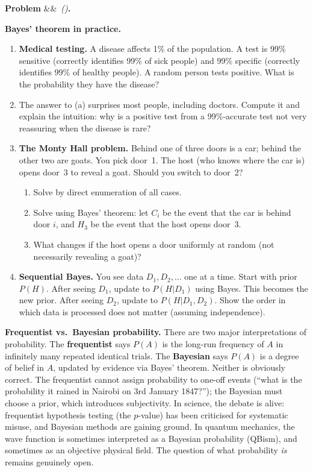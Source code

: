 \documentclass[12pt, a4paper]{article}
\newcounter{problem}
\newenvironment{problem}[1][]{%
  \refstepcounter{problem}%
  \par\vspace{6pt}%
  \noindent\textbf{\color{MidBlue}Problem \theproblem}%
  \ifx&#1&\else\ \textit{(#1)}\fi\textbf{.}\enskip
}{\par\vspace{4pt}}
\begin{document}
\begin{problem}
\label{prob:bayes_apps}
\textbf{Bayes' theorem in practice.}
\begin{enumerate}[label=(\alph*),topsep=2pt]
  \item \textbf{Medical testing.} A disease affects 1\% of the population. A test is 99\% sensitive (correctly identifies 99\% of sick people) and 99\% specific (correctly identifies 99\% of healthy people). A random person tests positive. What is the probability they have the disease?
  \item The answer to (a) surprises most people, including doctors. Compute it and explain the intuition: why is a positive test from a 99\%-accurate test not very reassuring when the disease is rare?
  \item \textbf{The Monty Hall problem.} Behind one of three doors is a car; behind the other two are goats. You pick door~1. The host (who knows where the car is) opens door~3 to reveal a goat. Should you switch to door~2?
  \begin{enumerate}[label=(\roman*),noitemsep]
    \item Solve by direct enumeration of all cases.
    \item Solve using Bayes' theorem: let $C_i$ be the event that the car is behind door $i$, and $H_3$ be the event that the host opens door~3.
    \item What changes if the host opens a door uniformly at random (not necessarily revealing a goat)?
  \end{enumerate}
  \item \textbf{Sequential Bayes.} You see data $D_1,D_2,\ldots$ one at a time. Start with prior $P(H)$. After seeing $D_1$, update to $P(H|D_1)$ using Bayes. This becomes the new prior. After seeing $D_2$, update to $P(H|D_1,D_2)$. Show the order in which data is processed does not matter (assuming independence).
\end{enumerate}
\end{problem}

\begin{thought}
\textbf{Frequentist vs.\ Bayesian probability.}
There are two major interpretations of probability. The \textbf{frequentist} says $P(A)$ is the long-run frequency of $A$ in infinitely many repeated identical trials. The \textbf{Bayesian} says $P(A)$ is a degree of belief in $A$, updated by evidence via Bayes' theorem. Neither is obviously correct. The frequentist cannot assign probability to one-off events (``what is the probability it rained in Nairobi on 3rd January 1847?''); the Bayesian must choose a prior, which introduces subjectivity. In science, the debate is alive: frequentist hypothesis testing (the $p$-value) has been criticised for systematic misuse, and Bayesian methods are gaining ground. In quantum mechanics, the wave function is sometimes interpreted as a Bayesian probability (QBism), and sometimes as an objective physical field. The question of what probability \emph{is} remains genuinely open.
\end{thought}
\end{document}
